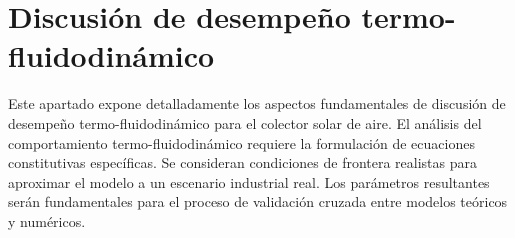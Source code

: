 \section{Discusión de desempeño termo-fluidodinámico}
\label{sec:cap09_discusion}

Este apartado expone detalladamente los aspectos fundamentales de discusión de desempeño termo-fluidodinámico para el colector solar de aire.
El análisis del comportamiento termo-fluidodinámico requiere la formulación de ecuaciones constitutivas específicas.
Se consideran condiciones de frontera realistas para aproximar el modelo a un escenario industrial real.
Los parámetros resultantes serán fundamentales para el proceso de validación cruzada entre modelos teóricos y numéricos.
